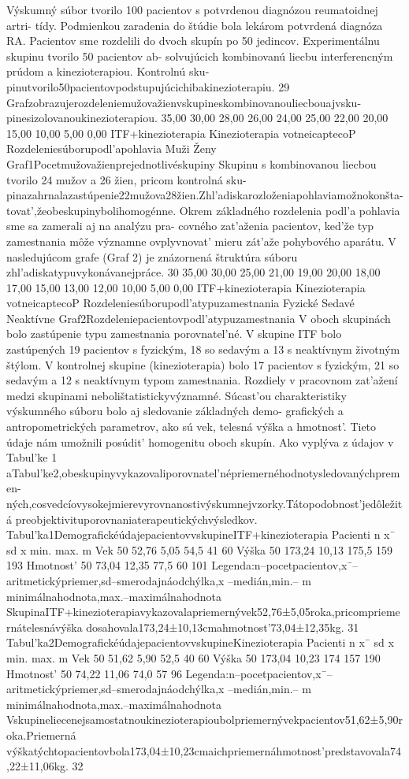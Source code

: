 Výskumný súbor tvorilo 100 pacientov s potvrdenou diagnózou reumatoidnej artri- tídy. Podmienkou zaradenia do štúdie bola lekárom potvrdená diagnóza RA. Pacientov sme rozdelili do dvoch skupín po 50 jedincov. Experimentálnu skupinu tvorilo 50 pacientov ab- solvujúcich kombinovanú liecbu interferencným prúdom a kinezioterapiou. Kontrolnú sku- pinutvorilo50pacientovpodstupujúcichibakinezioterapiu. 29 Grafzobrazujerozdeleniemužovažienvskupineskombinovanouliecbouajvsku- pinesizolovanoukinezioterapiou. 35,00 30,00 28,00 26,00 24,00 25,00 22,00 20,00 15,00 10,00 5,00 0,00 ITF+kinezioterapia Kinezioterapia votneicaptecoP Rozdeleniesúborupodl’apohlavia Muži Ženy Graf1Pocetmužovažienprejednotlivéskupiny Skupinu s kombinovanou liecbou tvorilo 24 mužov a 26 žien, pricom kontrolná sku- pinazahrnalazastúpenie22mužova28žien.Zhl’adiskarozloženiapohlaviamožnokonšta- tovat’,žeobeskupinybolihomogénne. Okrem základného rozdelenia podl’a pohlavia sme sa zamerali aj na analýzu pra- covného zat’aženia pacientov, ked’že typ zamestnania môže významne ovplyvnovat’ mieru zát’aže pohybového aparátu. V nasledujúcom grafe (Graf 2) je znázornená štruktúra súboru zhl’adiskatypuvykonávanejpráce. 30 35,00 30,00 25,00 21,00 19,00 20,00 18,00 17,00 15,00 13,00 12,00 10,00 5,00 0,00 ITF+kinezioterapia Kinezioterapia votneicaptecoP Rozdeleniesúborupodl’atypuzamestnania Fyzické Sedavé Neaktívne Graf2Rozdeleniepacientovpodl’atypuzamestnania V oboch skupinách bolo zastúpenie typu zamestnania porovnatel’né. V skupine ITF bolo zastúpených 19 pacientov s fyzickým, 18 so sedavým a 13 s neaktívnym životným štýlom. V kontrolnej skupine (kinezioterapia) bolo 17 pacientov s fyzickým, 21 so sedavým a 12 s neaktívnym typom zamestnania. Rozdiely v pracovnom zat’ažení medzi skupinami nebolištatistickyvýznamné. Súcast’ou charakteristiky výskumného súboru bolo aj sledovanie základných demo- grafických a antropometrických parametrov, ako sú vek, telesná výška a hmotnost’. Tieto údaje nám umožnili posúdit’ homogenitu oboch skupín. Ako vyplýva z údajov v Tabul’ke 1 aTabul’ke2,obeskupinyvykazovaliporovnatel’népriemernéhodnotysledovanýchpremen- ných,cosvedcíovysokejmierevyrovnanostivýskumnejvzorky.Tátopodobnost’jedôležitá preobjektivituporovnaniaterapeutickýchvýsledkov. Tabul’ka1DemografickéúdajepacientovvskupineITF+kinezioterapia Pacienti n x¯ sd x min. max. m Vek 50 52,76 5,05 54,5 41 60 Výška 50 173,24 10,13 175,5 159 193 Hmotnost’ 50 73,04 12,35 77,5 60 101 Legenda:n--pocetpacientov,x¯--aritmetickýpriemer,sd--smerodajnáodchýlka,x --medián,min.-- m minimálnahodnota,max.--maximálnahodnota SkupinaITF+kinezioterapiavykazovalapriemernývek52,76±5,05roka,pricompriemernátelesnávýška dosahovala173,24±10,13cmahmotnost’73,04±12,35kg. 31 Tabul’ka2DemografickéúdajepacientovvskupineKinezioterapia Pacienti n x¯ sd x min. max. m Vek 50 51,62 5,90 52,5 40 60 Výška 50 173,04 10,23 174 157 190 Hmotnost’ 50 74,22 11,06 74,0 57 96 Legenda:n--pocetpacientov,x¯--aritmetickýpriemer,sd--smerodajnáodchýlka,x --medián,min.-- m minimálnahodnota,max.--maximálnahodnota Vskupineliecenejsamostatnoukinezioterapioubolpriemernývekpacientov51,62±5,90roka.Priemerná výškatýchtopacientovbola173,04±10,23cmaichpriemernáhmotnost’predstavovala74,22±11,06kg. 32


